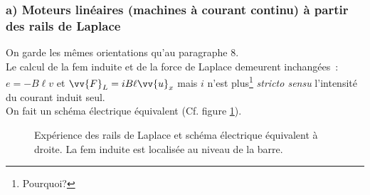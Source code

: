 \documentclass{article}
\renewcommand\overrightarrow{\vv}
\begin{document}
\subsubsection*{a) Moteurs linéaires (machines à courant continu) à partir des rails de Laplace}
On garde les mêmes
orientations qu'au paragraphe 8. \\
Le calcul de la fem induite et de la force de Laplace demeurent
inchangées : $e = -B\ell v$ et $\overrightarrow{F}_{L} = iB\ell
\overrightarrow{u}_{x}$ mais $i$ n'est plus\footnote{Pourquoi?} \textit{stricto sensu} l'intensité du courant induit seul. \\
On fait un schéma électrique équivalent (Cf. figure \ref{Fig.5}).

\begin{figure}[h]
\begin{center}
\end{center}
\caption{Expérience des rails de Laplace et schéma électrique
équivalent à droite. La fem induite est localisée au niveau de la
barre.}\label{Fig.5}
\end{figure}
\end{document}
